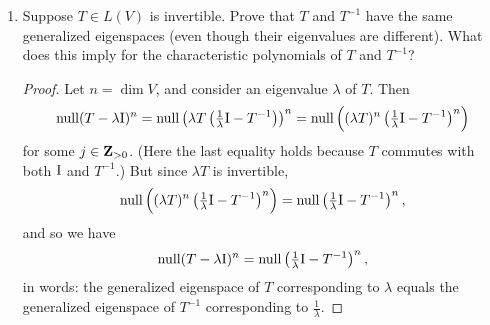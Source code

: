 \documentclass[11pt]{amsart}
\begin{document}
\begin{enumerate}[(1)]
\begin{proof}
Next we'll prove that $V = \null(T^n) + \range(T^n)$. Given $\v \in V$, we first remember that we proved in class $\range(T^n) = \range(T^{ 2n })$, and so $T^n(\v)$ (which is by definition in $\range(T^n)$) is in $\range(T^{ 2n })$, i.e.,
\[
  T^n(\v) = T^{ 2n } (\u)
\]
for some $\u \in V$. But this can be rewritten as $T^n \left( \v - T^n(\u) \right) = \0$, i.e., $\v - T^n(\u) \in \null(T^n)$, i.e., $v \in \null(T^n) + \range(T^n)$.

Finally, we'll prove that $\null(T^n) + \range(T^n)$ is a direct sum.
Suppose $\v \in \null(T^n) \cap \range(T^n)$, i.e.,
\[
  T^n (\v) = \0
  \qquad \text{ and } \qquad
  T^n(\u) = \v
\]
for some $\u \in V$. But then $T^{ 2n } (\u) = T^n(\v) = \0$, i.e., $\u \in \null(T^{ 2n }) = \null(T^n)$ (using the same result from class again). This means $\v = T^n(\u) = \0$, and so $\null(T^n) \cap \range(T^n) = \{ \0 \}$ and $V = \null(T^n) \oplus \range(T^n)$.
\end{proof}

\item Suppose $T \in L(V)$ is invertible. Prove that $T$ and $T^{ -1 }$ have the same generalized eigenspaces (even though their eigenvalues are different).
What does this imply for the characteristic polynomials of $T$ and $T^{ -1 }$?

\begin{proof}
Let $n = \dim V$, and consider an eigenvalue $\lambda$ of $T$. Then
\[
  \operatorname{null} (T - \lambda \mathrm I)^n
  = \operatorname{null} \left( \lambda T \left( \tfrac 1 \lambda \mathrm I - T^{ -1 } \right) \right)^n
  = \operatorname{null} \left( (\lambda T)^n \left( \tfrac 1 \lambda \mathrm I - T^{ -1 } \right)^n \right)
\]
for some $j \in \mathbf{Z}_{ >0 } $.
(Here the last equality holds because $T$ commutes with both $\mathrm I$ and $T^{ -1 }$.)
But since $\lambda T$ is invertible,
\[
  \operatorname{null} \left( (\lambda T)^n \left( \tfrac 1 \lambda \mathrm I - T^{ -1 } \right)^n \right)
  = \operatorname{null} \left( \tfrac 1 \lambda \mathrm I - T^{ -1 } \right)^n ,
\]
and so we have
\[
  \operatorname{null} (T - \lambda \mathrm I)^n
  = \operatorname{null} \left( \tfrac 1 \lambda \mathrm I - T^{ -1 } \right)^n ,
\]
in words: the generalized eigenspace of $T$ corresponding to $\lambda$ equals the generalized eigenspace of $T^{ -1 }$ corresponding to $\frac 1 \lambda$.


\end{proof}
\end{enumerate}
\end{document}

